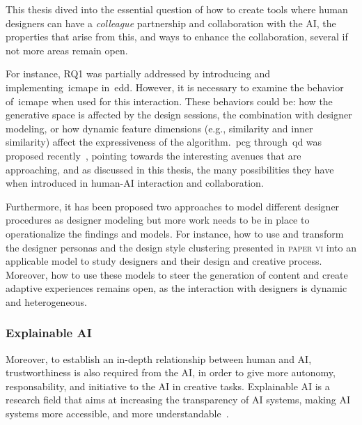 This thesis dived into the essential question of how to create tools where human designers can have a \emph{colleague} partnership and collaboration with the AI, the properties that arise from this, and ways to enhance the collaboration, several if not more areas remain open. 

For instance, \textsc{RQ1} was partially addressed by introducing and implementing~\acrshort{icmape} in~\acrshort{edd}. However, it is necessary to examine the behavior of~\acrshort{icmape} when used for this interaction. These behaviors could be: how the generative space is affected by the design sessions, the combination with designer modeling, or how dynamic feature dimensions (e.g., similarity and inner similarity) affect the expressiveness of the algorithm.~\acrshort{pcg} through~\acrshort{qd} was proposed recently~\cite{gravina2019procedural}, pointing towards the interesting avenues that are approaching, and as discussed in this thesis, the many possibilities they have when introduced in human-AI interaction and collaboration.

Furthermore, it has been proposed two approaches to model different designer procedures as designer modeling but more work needs to be in place to operationalize the findings and models. For instance, how to use and transform the designer personas and the design style clustering presented in \textsc{paper vi} into an applicable model to study designers and their design and creative process. Moreover, how to use these models to steer the generation of content and create adaptive experiences remains open, as the interaction with designers is dynamic and heterogeneous.


\subsubsection{Explainable AI}

Moreover, to establish an in-depth relationship between human and AI, trustworthiness is also required from the AI, in order to give more autonomy, responsability, and initiative to the AI in creative tasks. Explainable AI is a research field that aims at increasing the transparency of AI systems, making AI systems more accessible, and more understandable~\cite{adadi2018peeking,Doshi-Velez2018}.

